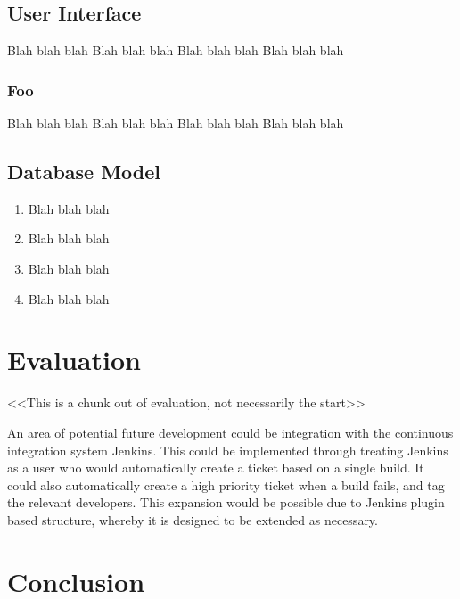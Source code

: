 \documentclass{l3proj}
\begin{document}
\section{User Interface}

Blah blah blah
Blah blah blah
Blah blah blah
Blah blah blah

\subsection{Foo}

Blah blah blah
Blah blah blah
Blah blah blah
Blah blah blah

\section{Database Model}

\begin{enumerate}
\item Blah blah blah
\item Blah blah blah
\item Blah blah blah
\item Blah blah blah
\end{enumerate}



\chapter{Evaluation}

<<This is a chunk out of evaluation, not necessarily the start>>

An area of potential future development could be integration with the continuous integration system Jenkins.  This 
could be implemented through treating Jenkins as a user who would automatically create a ticket based on a single build.  
It could also automatically create a high priority ticket when a build fails, and tag the relevant developers.  This 
expansion would be possible due to Jenkins plugin based structure, whereby it is designed to be extended as necessary.

\chapter{Conclusion}
\end{document}
